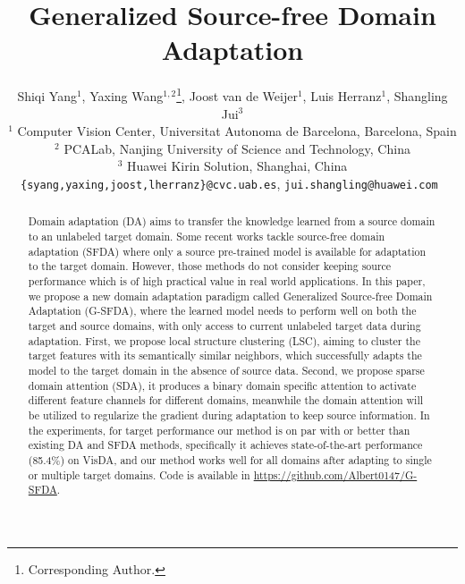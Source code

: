 \documentclass[10pt,twocolumn,letterpaper]{article}
\begin{document}
\title{Generalized Source-free Domain Adaptation}

\author{Shiqi Yang$^{1}$, Yaxing Wang$^{1,2}$\thanks{Corresponding Author.}, Joost van de Weijer$^{1}$, Luis Herranz$^{1}$, Shangling Jui$^{3}$\\
$^{1}$ Computer Vision Center, Universitat Autonoma de Barcelona, Barcelona, Spain\\
$^{2}$ PCALab, Nanjing University of Science and Technology, China\\
$^{3}$ Huawei Kirin Solution, Shanghai, China\\
{\tt\small \{syang,yaxing,joost,lherranz\}@cvc.uab.es}, \tt\small{jui.shangling@huawei.com}
}

\maketitle
\ificcvfinal\thispagestyle{empty}\fi

\begin{abstract}
   Domain adaptation (DA) aims to transfer the knowledge learned from a source domain to an unlabeled target domain. Some recent works tackle source-free domain adaptation (SFDA) where only a source pre-trained model is available for adaptation to the target domain. However, those methods do not consider keeping source performance which is of high practical value in real world applications. In this paper, we propose a new domain adaptation paradigm called Generalized Source-free Domain Adaptation (G-SFDA), where the learned model needs to perform well on both the target and source domains, with only access to current unlabeled target data during adaptation. First, we propose local structure clustering (LSC), aiming to cluster the target features with its semantically similar neighbors, which successfully adapts the model to the target domain in the absence of source data. Second, we propose sparse domain attention (SDA), it produces a binary domain specific attention to activate different feature channels for different domains, meanwhile the domain attention will be utilized to regularize the gradient during adaptation to keep source information.  In the experiments, for target performance our method is on par with or better than existing DA and SFDA methods, specifically it achieves state-of-the-art performance (85.4\%) on VisDA, and our method works well for all domains after adapting to single or multiple target domains. Code is available in \url{https://github.com/Albert0147/G-SFDA}.
\end{abstract}
\end{document}
